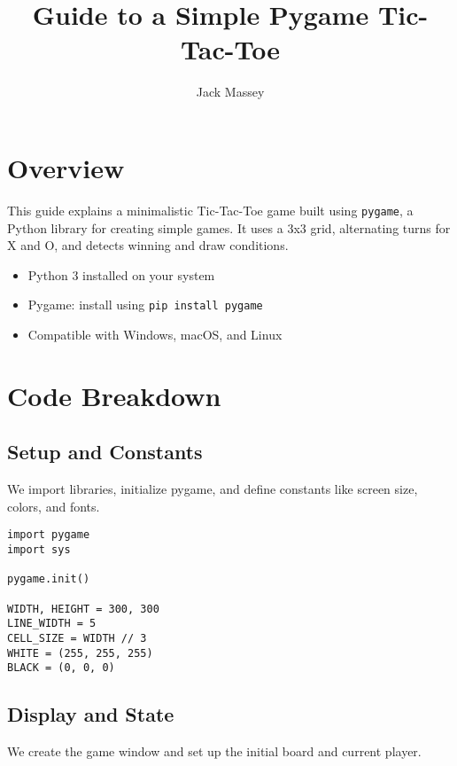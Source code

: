 \documentclass{article}
\title{Guide to a Simple Pygame Tic-Tac-Toe}
\author{Jack Massey}
\date{}
\begin{document}
\maketitle

\section{Overview}

This guide explains a minimalistic Tic-Tac-Toe game built using \texttt{pygame}, a Python library for creating simple games. It uses a 3x3 grid, alternating turns for X and O, and detects winning and draw conditions.

\begin{tcolorbox}[colback=blue!5!white, title=Requirements]
\begin{itemize}
    \item Python 3 installed on your system
    \item Pygame: install using \texttt{pip install pygame}
    \item Compatible with Windows, macOS, and Linux
\end{itemize}
\end{tcolorbox}

\section{Code Breakdown}

\subsection{Setup and Constants}

We import libraries, initialize pygame, and define constants like screen size, colors, and fonts.

\begin{lstlisting}[style=pythonstyle]
import pygame
import sys

pygame.init()

WIDTH, HEIGHT = 300, 300
LINE_WIDTH = 5
CELL_SIZE = WIDTH // 3
WHITE = (255, 255, 255)
BLACK = (0, 0, 0)
\end{lstlisting}

\subsection{Display and State}

We create the game window and set up the initial board and current player.
\end{document}
